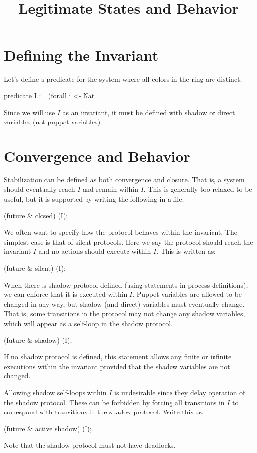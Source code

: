 
\title{Legitimate States and Behavior}
\date{}



\section{Defining the Invariant}

Let's define a predicate for the system where all colors in the ring are distinct.
\begin{code}
predicate I := (forall i <- Nat %
\end{code}

Since we will use $I$ as an invariant, it must be defined with shadow or direct variables (not puppet variables).

\section{Convergence and Behavior}

Stabilization can be defined as both convergence and closure.
That is, a system should eventually reach $I$ and remain within $I$.
This is generally too relaxed to be useful, but it is supported by writing the following in a  file:
\begin{code}
(future & closed) (I);
\end{code}

We often want to specify how the protocol behaves within the invariant.
The simplest case is that of silent protocols.
Here we say the protocol should reach the invariant $I$ and no actions should execute within $I$.
This is written as:
\begin{code}
(future & silent) (I);
\end{code}

When there is shadow protocol defined (using  statements in process definitions), we can enforce that it is executed within $I$.
Puppet variables are allowed to be changed in any way, but shadow (and direct) variables must eventually change.
That is, some transitions in the protocol may not change any shadow variables, which will appear as a self-loop in the shadow protocol.
\begin{code}
(future & shadow) (I);
\end{code}
If no shadow protocol is defined, this statement allows any finite or infinite executions within the invariant provided that the shadow variables are not changed.

Allowing shadow self-loops within $I$ is undesirable since they delay operation of the shadow protocol.
These can be forbidden by forcing all transitions in $I$ to correspond with transitions in the shadow protocol.
Write this as:
\begin{code}
(future & active shadow) (I);
\end{code}
Note that the shadow protocol must not have deadlocks.


